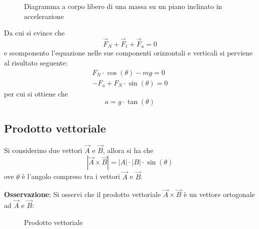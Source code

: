 \documentclass[a4paper]{extarticle}
\begin{document}
\vspace{1em}
\begin{figure}[H]
  \centering
  \caption{Diagramma a corpo libero di una massa su un piano inclinato in accelerazione}
  \label{fig:diagramma_corpo_libero_massa_piano_inclinato_in_accelerazione}
\end{figure}

\vspace{1em}
\noindent
Da cui si evince che
\[\vec{F}_N + \vec{F}_t + \vec{F}_a = 0\]
e scomponento l'equazione nelle sue componenti orizzontali e verticali si perviene al risultato seguente:
\begin{align*}
  F_N \cdot \cos(\theta) - mg = 0\\
  -F_a + F_N \cdot \sin(\theta) = 0
\end{align*}
per cui si ottiene che
\[a = g \cdot \tan(\theta)\]

\vspace{1em}
\subsection{Prodotto vettoriale}
Si considerino due vettori $\vec{A}$ e $\vec{B}$, allora si ha che
\[\left \vert \vec{A} \times \vec{B} \right \vert = \left \vert A \right \vert \cdot \left \vert B \right \vert \cdot \sin(\theta)\]
ove $\theta$ è l'angolo compreso tra i vettori $\vec{A}$ e $\vec{B}$.

\vspace{1em}
\noindent
\textbf{Osservazione}: Si osservi che il prodotto vettoriale $\vec{A} \times \vec{B}$ è un vettore ortogonale ad $\vec{A}$ e $\vec{B}$:

\begin{figure}[H]
  \centering
  \caption{Prodotto vettoriale}
  \label{fig:prodotto_vettoriale}
\end{figure}
\end{document}
